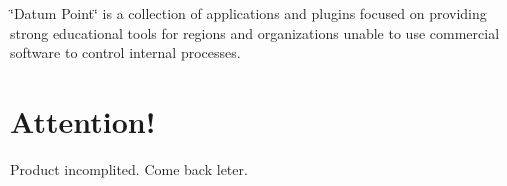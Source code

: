 \char`\"{}\+Datum Point\char`\"{} is a collection of applications and plugins focused on providing strong educational tools for regions and organizations unable to use commercial software to control internal processes.

\section*{Attention!}

Product incomplited. Come back leter. 